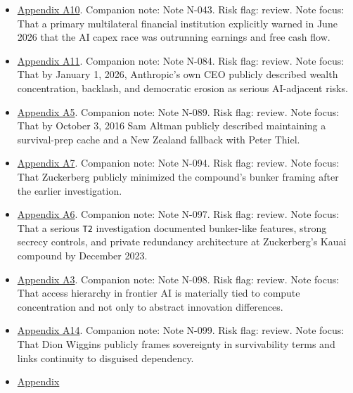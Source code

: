 \documentclass[
  american,
  11pt,
  letterpaper,
]{article}
\providecommand{\tightlist}{%
  \setlength{\itemsep}{0pt}\setlength{\parskip}{0pt}}
\begin{document}
\begin{itemize}
\tightlist
\item
  \hyperref[ch-09-appendix-a10-annual-economic-report-2026]{Appendix
  A10}. Companion note: Note N-043. Risk flag: review. Note focus: That
  a primary multilateral financial institution explicitly warned in June
  2026 that the AI capex race was outrunning earnings and free cash
  flow.
\item
  \hyperref[ch-09-appendix-a11-the-adolescence-of-technology]{Appendix
  A11}. Companion note: Note N-084. Risk flag: review. Note focus: That
  by January 1, 2026, Anthropic's own CEO publicly described wealth
  concentration, backlash, and democratic erosion as serious AI-adjacent
  risks.
\item
  \hyperref[ch-09-appendix-a5-sam-altman-s-manifest-destiny]{Appendix
  A5}. Companion note: Note N-089. Risk flag: review. Note focus: That
  by October 3, 2016 Sam Altman publicly described maintaining a
  survival-prep cache and a New Zealand fallback with Peter Thiel.
\item
  \hyperref[ch-09-appendix-a7-mark-zuckerberg-downplays-his-5-000-square-foot-underground-bunker-in-hawaii-just-a-little-shelter]{Appendix
  A7}. Companion note: Note N-094. Risk flag: review. Note focus: That
  Zuckerberg publicly minimized the compound's bunker framing after the
  earlier investigation.
\item
  \hyperref[ch-09-appendix-a6-inside-mark-zuckerbergs-top-secret-hawaii-compound]{Appendix
  A6}. Companion note: Note N-097. Risk flag: review. Note focus: That a
  serious \texttt{T2} investigation documented bunker-like features,
  strong secrecy controls, and private redundancy architecture at
  Zuckerberg's Kauai compound by December 2023.
\item
  \hyperref[ch-09-appendix-a3-computing-power-and-the-governance-of-artificial-intelligence]{Appendix
  A3}. Companion note: Note N-098. Risk flag: review. Note focus: That
  access hierarchy in frontier AI is materially tied to compute
  concentration and not only to abstract innovation differences.
\item
  \hyperref[ch-09-appendix-a14-the-digital-sovereignty-imperative]{Appendix
  A14}. Companion note: Note N-099. Risk flag: review. Note focus: That
  Dion Wiggins publicly frames sovereignty in survivability terms and
  links continuity to disguised dependency.
\item
  \hyperref[ch-09-appendix-a2-gpts-are-gpts-an-early-look-at-the-labor-market-impact-potential-of-large-language-models]{Appendix
}
\end{itemize}
\end{document}
